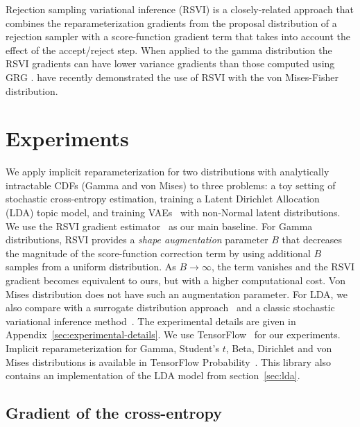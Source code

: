 \documentclass{article}
\begin{document}
Rejection sampling variational inference (RSVI) \citep{naesseth2017reparameterization} is a closely-related approach that combines the reparameterization gradients from the proposal distribution of a rejection sampler with a score-function gradient term that takes into account the effect of the accept/reject step. When applied to the gamma distribution the RSVI gradients can have lower variance gradients than those computed using GRG \citep{naesseth2017reparameterization}.
\citet{davidson2018hyperspherical} have recently demonstrated the use of RSVI with the von Mises-Fisher distribution.

 
\section{Experiments}

We apply implicit reparameterization for two distributions with analytically intractable CDFs (Gamma and von Mises) to three problems: a toy setting of stochastic cross-entropy estimation, training a Latent Dirichlet Allocation~\cite{blei2003latent} (LDA) topic model, and training VAEs~\cite{kingma2014auto,rezende2014stochastic} with non-Normal latent distributions.
We use the RSVI gradient estimator~\cite{naesseth2017reparameterization} as our main baseline.
For Gamma distributions, RSVI provides a \emph{shape augmentation} parameter $B$ that decreases the magnitude of the score-function correction term by using additional $B$ samples from a uniform distribution.
As $B \to \infty$, the term vanishes and the RSVI gradient becomes equivalent to ours, but with a higher computational cost.
Von Mises distribution does not have such an augmentation parameter.
For LDA, we also compare with a surrogate distribution approach~\cite{srivastava2017autoencoding} and a classic stochastic variational inference method~\cite{hoffman2013stochastic}.
The experimental details are given in Appendix~\ref{sec:experimental-details}.
We use TensorFlow~\cite{abadi2016tensorflow} for our experiments.
Implicit reparameterization for Gamma, Student's $t$, Beta, Dirichlet and von Mises distributions is available in TensorFlow Probability~\cite{dillon2017tensorflow}.
This library also contains an implementation of the LDA model from section~\ref{sec:lda}.

\subsection{Gradient of the cross-entropy}
\end{document}
